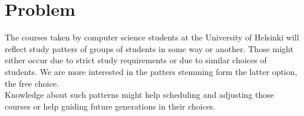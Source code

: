 \section{Problem}

The courses taken by computer science students at the University of Helsinki will reflect study patters of groups of students in some way or another. Those might either occur due to strict study requirements or due to similar choices of students. We are more interested in the patters stemming form the latter option, the free choice.\\

Knowledge about such patterns might help scheduling and adjusting those courses or help guiding future generations in their choices.\\


